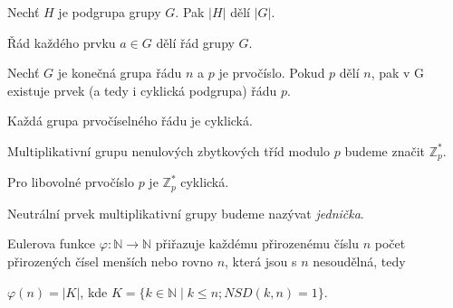 \documentclass[
  program=infoi,
  biblatex,
  figures=false,
  glossaries,
  index
]{kidiplom}
\begin{document}
    \begin{theorem}
        
        Nechť $H$ je podgrupa grupy $G$. Pak $|H|$ dělí $|G|$.
    \end{theorem}

    \begin{consequence}
        Řád každého prvku $a \in G$ dělí řád grupy $G$.
    \end{consequence}

    


    \begin{theorem}

        Nechť $G$ je konečná grupa řádu $n$ a $p$ je prvočíslo.
        Pokud $p$ dělí $n$, pak v G existuje prvek (a tedy i cyklická podgrupa) řádu $p$.

    \end{theorem}

    \begin{consequence}\label{con:prime-cyclic}
        Každá grupa prvočíselného řádu je cyklická.
    \end{consequence}



    \begin{definition}\label{def:Z*p}
        Multiplikativní grupu nenulových zbytkových tříd modulo $p$ budeme značit $\mathbb{Z}^*_p$.
    \end{definition}

    \begin{theorem}
        Pro libovolné prvočíslo $p$ je $\mathbb{Z}^*_p$ cyklická.
    \end{theorem}

    \begin{definition}
        Neutrální prvek multiplikativní grupy budeme nazývat \emph{jednička}.
    \end{definition}




    \begin{definition}
        Eulerova funkce $\varphi: \mathbb{N} \rightarrow \mathbb{N}$ přiřazuje každému přirozenému číslu $n$
        počet přirozených čísel menších nebo rovno $n$, která jsou s $n$ nesoudělná, tedy

        \begin{center}
            $\varphi(n) = |K|$, kde $K = \{k \in \mathbb{N} \mid k \leq n; NSD(k,n)=1\}$.
        \end{center}

    \end{definition}
\end{document}
